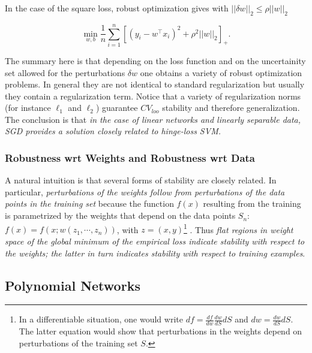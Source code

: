 \documentclass[10pt]{article}
\begin{document}
\begin{enumerate}
In the case of the square loss, robust optimization gives with
$||\delta w||_2 \leq \rho ||w||_2$


\begin{equation}
\min_{w,b}  \frac{1}{n} \sum _{i=1}^n [(y_i - w^\intercal x_i)^2 + \rho^2 ||w||_2]_+.
\label{SquareRobustOptimization}
\end{equation}

The summary here is that depending on the loss function and on the
uncertainity set allowed for the perturbations $\delta w$ one obtains
a variety of robust optimization problems. In general they are not
identical to standard regularization but usually they contain a
regularization term. Notice that a variety of regularization norms
(for instance $\ell_1$ and $\ell_2$) guarantee $CV_{loo}$ stability
and therefore generalization. The conclusion is that {\it in the case
  of  linear networks and linearly separable data, SGD provides a
solution closely related to hinge-loss SVM.}

\end{enumerate}




\subsubsection{Robustness wrt Weights and Robustness wrt Data}
\label{RobPert}
A natural intuition
is that several forms of stability are closely related. In particular,
{\it perturbations of the weights follow from perturbations of the
  data points in the training set} because the function $f(x)$ resulting from the training
is parametrized by the weights that depend on the data points $S_n$:
$f(x) = f(x; w (z_1, \cdots, z_n))$, with $z= (x,y)$\footnote{In a
  differentiable situation,  one would write $df = \frac{df}{dw}
  \frac{dw}{dS} dS$ and $dw= \frac{dw}{dS} dS$. The latter equation
  would show that perturbations in the weights depend on perturbations of
  the training set $S$.} . Thus {\it flat regions in weight space of the global minimum of the
  empirical loss indicate stability with respect to the weights; the
  latter in turn indicates  stability with respect to training examples}.








\subsection{Polynomial Networks}
\label{SectionPolynomials}
\end{document}
